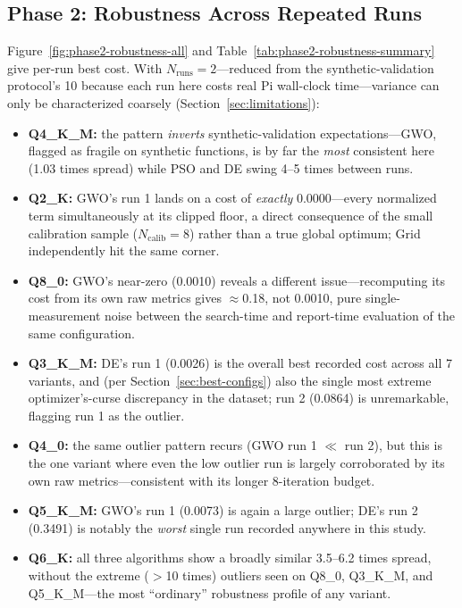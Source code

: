 \documentclass[conference, letterpaper]{IEEEtran}
\begin{document}
\subsection{Phase 2: Robustness Across Repeated Runs}
\label{sec:robustness}

Figure~\ref{fig:phase2-robustness-all} and Table~\ref{tab:phase2-robustness-summary} give per-run best cost. With $N_{\text{runs}}=2$---reduced from the synthetic-validation protocol's 10 because each run here costs real Pi wall-clock time---variance can only be characterized coarsely (Section~\ref{sec:limitations}):

\begin{itemize}
  \item \textbf{Q4\_K\_M:} the pattern \emph{inverts} synthetic-validation expectations---GWO, flagged as fragile on synthetic functions, is by far the \emph{most} consistent here (1.03 times spread) while PSO and DE swing 4--5 times between runs.
  \item \textbf{Q2\_K:} GWO's run 1 lands on a cost of \emph{exactly} 0.0000---every normalized term simultaneously at its clipped floor, a direct consequence of the small calibration sample ($N_{\text{calib}}=8$) rather than a true global optimum; Grid independently hit the same corner.
  \item \textbf{Q8\_0:} GWO's near-zero (0.0010) reveals a different issue---recomputing its cost from its own raw metrics gives $\approx$0.18, not 0.0010, pure single-measurement noise between the search-time and report-time evaluation of the same configuration.
  \item \textbf{Q3\_K\_M:} DE's run 1 (0.0026) is the overall best recorded cost across all 7 variants, and (per Section~\ref{sec:best-configs}) also the single most extreme optimizer's-curse discrepancy in the dataset; run 2 (0.0864) is unremarkable, flagging run 1 as the outlier.
  \item \textbf{Q4\_0:} the same outlier pattern recurs (GWO run 1 $\ll$ run 2), but this is the one variant where even the low outlier run is largely corroborated by its own raw metrics---consistent with its longer 8-iteration budget.
  \item \textbf{Q5\_K\_M:} GWO's run 1 (0.0073) is again a large outlier; DE's run 2 (0.3491) is notably the \emph{worst} single run recorded anywhere in this study.
  \item \textbf{Q6\_K:} all three algorithms show a broadly similar 3.5--6.2 times spread, without the extreme ($>$10 times) outliers seen on Q8\_0, Q3\_K\_M, and Q5\_K\_M---the most ``ordinary'' robustness profile of any variant.
\end{itemize}
\end{document}

